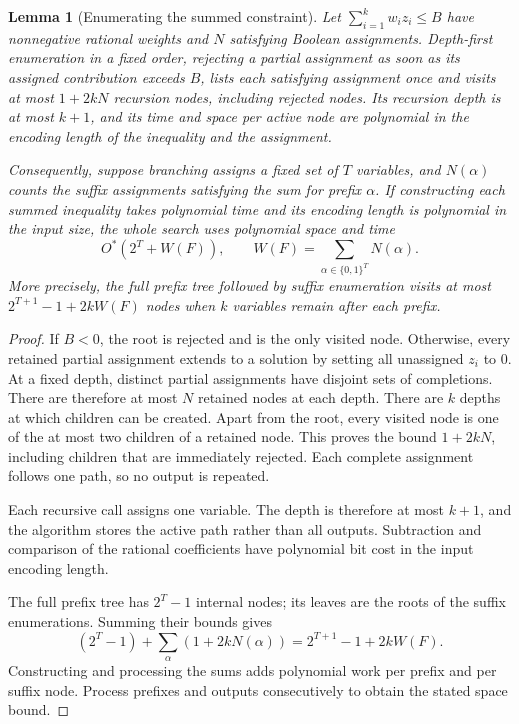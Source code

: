 \documentclass[11pt,a4paper]{article}
\newtheorem{lemma}[theorem]{Lemma}
\theoremstyle{definition}
\theoremstyle{remark}
\newcommand{\Ostar}{O^{*}}
\newcommand{\bits}{\{0,1\}}
\begin{document}
\begin{lemma}[Enumerating the summed constraint]\label{lem:enumeration}
Let $\sum_{i=1}^k w_i z_i\le B$ have nonnegative rational weights and $N$
satisfying Boolean assignments. Depth-first enumeration in a fixed order,
rejecting a partial assignment as soon as its assigned contribution exceeds
$B$, lists each satisfying assignment once and visits at most $1+2kN$
recursion nodes, including rejected nodes. Its recursion depth is at most
$k+1$, and its time and space per active node are polynomial in the encoding
length of the inequality and the assignment.

Consequently, suppose branching assigns a fixed set of $T$ variables,
and $N(\alpha)$ counts the suffix assignments satisfying the sum for
prefix $\alpha$. If constructing each summed inequality takes polynomial
time and its encoding length is polynomial in the input size, the whole
search uses polynomial space and time
\begin{equation}
 \Ostar(2^T+W(F)),\qquad W(F)=\sum_{\alpha\in\bits^T}N(\alpha).
 \label{eq:enumerationcost}
\end{equation}
More precisely, the full prefix tree followed by suffix enumeration visits
at most $2^{T+1}-1+2kW(F)$ nodes when $k$ variables remain after each prefix.
\end{lemma}
\begin{proof}
If $B<0$, the root is rejected and is the only visited node. Otherwise,
every retained partial assignment extends to a solution by setting all
unassigned $z_i$ to $0$. At a fixed depth, distinct partial assignments
have disjoint sets of completions. There are therefore at most $N$
retained nodes at each depth. There are $k$ depths at which children can
be created. Apart from the root, every visited node is one of the at most
two children of a retained node. This proves the bound $1+2kN$, including
children that are immediately rejected. Each complete assignment follows
one path, so no output is repeated.

Each recursive call assigns one variable. The depth is therefore at most
$k+1$, and the algorithm stores the active path rather than all outputs.
Subtraction and comparison of the rational coefficients have polynomial
bit cost in the input encoding length.

The full prefix tree has $2^T-1$ internal nodes; its leaves are the roots
of the suffix enumerations. Summing their bounds gives
\[
 (2^T-1)+\sum_\alpha(1+2kN(\alpha))
 =2^{T+1}-1+2kW(F).
\]
Constructing and processing the sums adds polynomial work per prefix and
per suffix node. Process prefixes and outputs consecutively to obtain
the stated space bound.
\end{proof}
\end{document}
